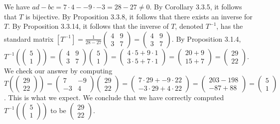 \documentclass[12pt]{article}
\newenvironment{problem}[2][Problem]
{
	\begin{trivlist} 
		\item[\hskip \labelsep {\bfseries #1 #2:}]
	}
{
	\end{trivlist}
	}
\newenvironment{solution}[1][Solution]
{
	\begin{trivlist} 
		\item[\hskip \labelsep {\itshape #1:}]
	}
	{
	\end{trivlist}
}
\begin{document}
\begin{problem}{3}
\begin{solution}
We have $ad-bc=7\cdot 4 - -9 \cdot -3 = 28 - 27 \neq 0$. By Corollary 3.3.5, it follows that $T$ is bijective. By Proposition 3.3.8, it follows that there exists an inverse for $T$. By Proposition 3.3.14, it follows that the inverse of $T$, denoted $T^{-1}$, has the standard matrix $[T^{-1}]=\frac{1}{28-27} \begin{pmatrix} 4&9\\3&7\end{pmatrix} = \begin{pmatrix} 4&9\\3&7\end{pmatrix}$. By Proposition 3.1.4, $T^{-1}\left(\begin{pmatrix}5\\1\end{pmatrix}\right)=\begin{pmatrix} 4&9\\3&7\end{pmatrix}\begin{pmatrix}5\\1\end{pmatrix} = \begin{pmatrix} 4\cdot 5 + 9\cdot 1\\3\cdot 5 + 7\cdot 1\end{pmatrix} = \begin{pmatrix} 20 + 9\\15 + 7\end{pmatrix} = \begin{pmatrix} 29\\22 \end{pmatrix}$. We check our answer by computing $T\left(\begin{pmatrix} 29\\22 \end{pmatrix}\right) = \begin{pmatrix}7 &-9\\-3 & 4 \end{pmatrix}\begin{pmatrix} 29\\22 \end{pmatrix} =  \begin{pmatrix}7\cdot 29 + -9\cdot 22\\-3\cdot 29 + 4\cdot 22 \end{pmatrix} = \begin{pmatrix}203-198 \\-87+88 \end{pmatrix} = \begin{pmatrix}5\\1\end{pmatrix}$. This is what we expect. We conclude that we have correctly computed $T^{-1}\left(\begin{pmatrix}5\\1 \end{pmatrix} \right)$ to be $\begin{pmatrix}29\\22\end{pmatrix}$.

\end{solution}
\end{problem}
\end{document}
